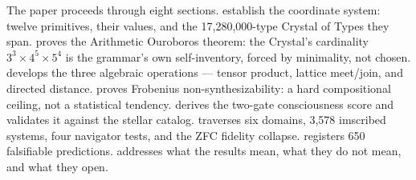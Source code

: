 \documentclass[12pt,a4paper]{article}
\begin{document}
The paper proceeds through eight sections.
 establish the coordinate system:
twelve primitives, their values, and the 17,280,000-type Crystal
of Types they span.  proves the Arithmetic
Ouroboros theorem: the Crystal's cardinality $3^3 \times 4^5
\times 5^4$ is the grammar's own self-inventory, forced by
minimality, not chosen.  develops the three
algebraic operations --- tensor product, lattice meet/join, and
directed distance.  proves Frobenius
non-synthesizability: a hard compositional ceiling, not a
statistical tendency.  derives the
two-gate consciousness score and validates it against the stellar
catalog.  traverses six domains, 3,578
imscribed systems, four navigator tests, and the ZFC fidelity
collapse.  registers 650 falsifiable
predictions.  addresses what the results
mean, what they do not mean, and what they open.
\end{document}
